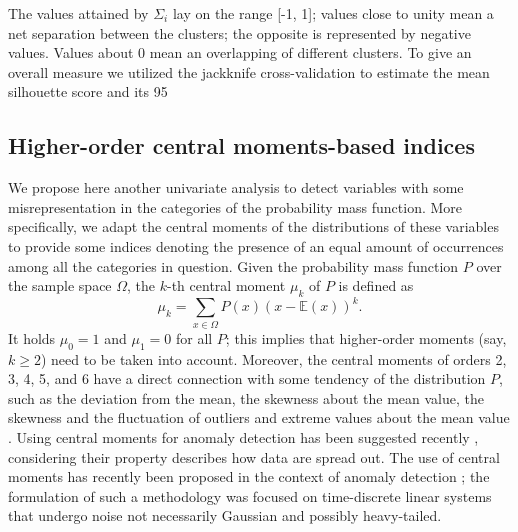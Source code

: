 The values attained by $\Sigma_{i}$ lay on the range [-1, 1]; values close to unity mean a net separation between the clusters; the opposite is represented by negative values.
Values about 0 mean an overlapping of different clusters.
To give an overall measure we utilized the jackknife cross-validation \cite[]{efron1981jackknife} to estimate the mean silhouette score and its 95\
\subsection{Higher-order central moments-based indices}\label{sec: Higher-order central moments-based indices}
We propose here another univariate analysis to detect variables with some misrepresentation in the categories of the probability mass function.
More specifically, we adapt the central moments of the distributions of these variables to provide some indices denoting the presence of an equal amount of occurrences among all the categories in question.
Given the probability mass function $P$ over the sample space $\Omega$, the $k$-th central moment $\mu_{k}$ of $P$ is defined as 
\begin{equation}\label{eq: central_moment_definition}
    \mu_{k} = \sum_{x \in \Omega} P(x)(x-\mathbb{E}(x))^{k}.
\end{equation}
It holds $\mu_0 = 1$ and $\mu_{1} = 0$ for all $P$; this implies that higher-order moments (say, $k\ge2$) need to be taken into account.
Moreover, the central moments of orders 2, 3, 4, 5, and 6 have a direct connection with some tendency of the distribution $P$, such as the deviation from the mean, the skewness about the mean value, the skewness and the fluctuation of outliers and extreme values about the mean value \cite[]{kamath2021explainable}.
Using central moments for anomaly detection has been suggested recently \cite[]{renganathan2021higher}, considering their property describes how data are spread out.
The use of central moments has recently been proposed in the context of anomaly detection \cite[]{renganathan2021higher}; the formulation of such a methodology was focused on time-discrete linear systems that undergo noise not necessarily Gaussian and possibly heavy-tailed.

